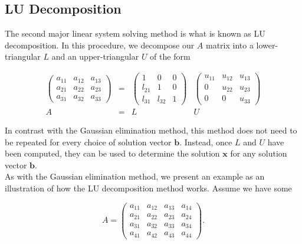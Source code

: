 \documentclass[12pt]{article}
\numberwithin{equation}{section}
\begin{document}
\subsection{LU Decomposition}
\label{subsec:ludecomp}

The second major linear system solving method is what is known as LU decomposition.  In this procedure, we decompose our $A$ matrix into a lower-triangular $L$ and an upper-triangular $U$ of the form

\begin{equation}
\label{eq:ludecomp1}
\begin{array}{cccc}
\left(
\begin{array}{ccc}
a_{11} & a_{12} & a_{13} \\
a_{21} & a_{22} & a_{23} \\
a_{31} & a_{32} & a_{33}
\end{array}
\right) &=&
\left(
\begin{array}{ccc}
1 & 0 & 0 \\
l_{21} & 1 & 0 \\
l_{31} & l_{32} & 1
\end{array}\right)&
\left(\begin{array}{ccc}
u_{11} & u_{12} & u_{13} \\
0 & u_{22} & u_{23} \\
0 & 0 & u_{33}
\end{array}\right) \\
A &=& L&U
\end{array}
\end{equation}

\noindent In contrast with the Gaussian elimination method, this method does not need to be repeated for every choice of solution vector $\textbf{b}$.  Instead, once $L$ and $U$ have been computed, they can be used to determine the solution $\textbf{x}$ for any solution vector $\textbf{b}$.
\\\indent As with the Gaussian elimination method, we present an example as an illustration of how the LU decomposition method works.  Assume we have some 

\begin{equation}
A = \left(\begin{array}{cccc}
a_{11} & a_{12} & a_{13} & a_{14} \\
a_{21} & a_{22} & a_{23} & a_{24} \\
a_{31} & a_{32} & a_{33} & a_{34} \\
a_{41} & a_{42} & a_{43} & a_{44}
\end{array}\right).
\end{equation}
\end{document}
